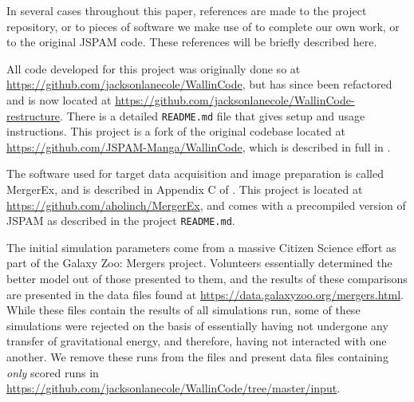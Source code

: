 In several cases throughout this paper, references are made to the project
repository, or to pieces of software we make use of to complete our own work, or
to the original JSPAM code. These references will be briefly described here.

All code developed for this project was originally done so at
\url{https://github.com/jacksonlanecole/WallinCode}, but has since been
refactored and is now located at
\url{https://github.com/jacksonlanecole/WallinCode-restructure}.
There is a detailed
\texttt{README.md} file that gives setup and usage instructions.
This project is
a fork of the original codebase located at
\url{https://github.com/JSPAM-Manga/WallinCode}, which is described in full in
\citet{Wallin2016}.

The software used for target data acquisition and image preparation is called
MergerEx, and is described in Appendix C of \citet{holincheckThesis}. This
project is located at \url{https://github.com/aholinch/MergerEx}, and comes with
a precompiled version of JSPAM as described in the project \texttt{README.md}.

The initial simulation parameters come from a massive Citizen Science effort as
part of the Galaxy Zoo: Mergers project. Volunteers essentially determined the
better model out of those presented to them, and the results of these
comparisons are presented in the data files found at
\url{https://data.galaxyzoo.org/mergers.html}. While these files contain
the results of all simulations run, some of these simulations were rejected on the
basis of essentially having not undergone any transfer of gravitational energy,
and therefore, having not interacted with one another. We remove these runs from
the files and present data files containing \textit{only} scored runs in
\url{https://github.com/jacksonlanecole/WallinCode/tree/master/input}.
